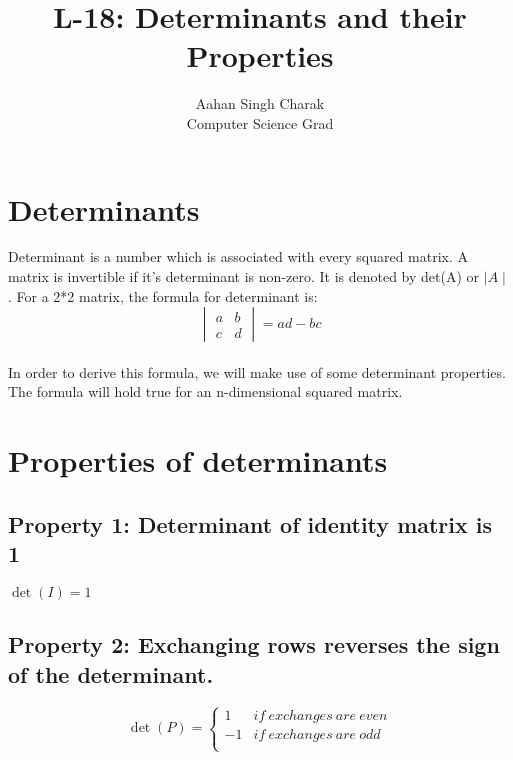 \documentclass[]{article}
\title{L-18: Determinants and their Properties}
\author{Aahan Singh Charak\\Computer Science Grad}
\begin{document}
	\maketitle
	\section{Determinants}
	\vspace{10pt}
	
	\noindent
	Determinant is a number which is associated with every squared matrix. A matrix is invertible if it's determinant is non-zero. It is denoted by det(A) or $\mid A \mid$. For a 2*2 matrix, the formula for determinant is:\\
	
	\noindent
	\[
  \begin{vmatrix}
  	a&b\\
  	c&d
  \end{vmatrix}=ad-bc
	\]\\
	
	In order to derive this formula, we will make use of some determinant properties. The formula will hold true for an n-dimensional squared matrix.\\
\vspace{10pt}

\section{Properties of determinants}
\vspace{10pt}

\subsection{Property 1: Determinant of identity matrix is 1}
\vspace{10pt}

\noindent
$\det(I)=1$	
\vspace{10pt}

\subsection{Property 2: Exchanging rows reverses the sign of the determinant.}
\vspace{10pt}
	\[ 
\det(P)=
\begin{cases} 
	1 & if \  exchanges \  are \ even \\
	-1 & if \  exchanges \ are \ odd \\ 
\end{cases}
\]\\
\end{document}
